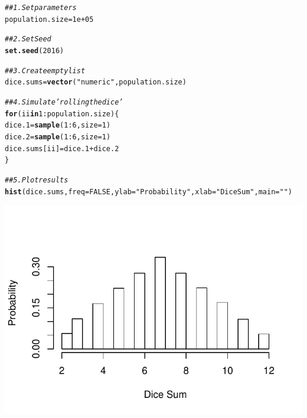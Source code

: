\documentclass{report}\usepackage[]{graphicx}\usepackage[]{color}
\makeatletter
\def\maxwidth{ %
  \ifdim\Gin@nat@width>\linewidth
    \linewidth
  \else
    \Gin@nat@width
  \fi
}
\newcommand{\hlnum}[1]{\textcolor[rgb]{0.686,0.059,0.569}{#1}}%
\newcommand{\hlstr}[1]{\textcolor[rgb]{0.192,0.494,0.8}{#1}}%
\newcommand{\hlcom}[1]{\textcolor[rgb]{0.678,0.584,0.686}{\textit{#1}}}%
\newcommand{\hlopt}[1]{\textcolor[rgb]{0,0,0}{#1}}%
\newcommand{\hlstd}[1]{\textcolor[rgb]{0.345,0.345,0.345}{#1}}%
\newcommand{\hlkwa}[1]{\textcolor[rgb]{0.161,0.373,0.58}{\textbf{#1}}}%
\newcommand{\hlkwb}[1]{\textcolor[rgb]{0.69,0.353,0.396}{#1}}%
\newcommand{\hlkwc}[1]{\textcolor[rgb]{0.333,0.667,0.333}{#1}}%
\newcommand{\hlkwd}[1]{\textcolor[rgb]{0.737,0.353,0.396}{\textbf{#1}}}%
\newenvironment{kframe}{%
 \def\at@end@of@kframe{}%
 \ifinner\ifhmode%
  \def\at@end@of@kframe{\end{minipage}}%
  \begin{minipage}{\columnwidth}%
 \fi\fi%
 \def\FrameCommand##1{\hskip\@totalleftmargin \hskip-\fboxsep
 \colorbox{shadecolor}{##1}\hskip-\fboxsep
     \hskip-\linewidth \hskip-\@totalleftmargin \hskip\columnwidth}%
 \MakeFramed {\advance\hsize-\width
   \@totalleftmargin\z@ \linewidth\hsize
   \@setminipage}}%
 {\par\unskip\endMakeFramed%
 \at@end@of@kframe}
\newenvironment{knitrout}{}{} %
\makeatother
\begin{document}
\begin{knitrout}
\color{fgcolor}\begin{kframe}
\begin{alltt}
\hlcom{## 1. Set parameters}
\hlstd{population.size} \hlkwb{=} \hlnum{1e+05}

\hlcom{## 2. Set Seed}
\hlkwd{set.seed}\hlstd{(}\hlnum{2016}\hlstd{)}

\hlcom{## 3. Create empty list}
\hlstd{dice.sums} \hlkwb{=} \hlkwd{vector}\hlstd{(}\hlstr{"numeric"}\hlstd{, population.size)}

\hlcom{## 4. Simulate 'rolling the dice'}
\hlkwa{for} \hlstd{(ii} \hlkwa{in} \hlnum{1}\hlopt{:}\hlstd{population.size) \{}
    \hlstd{dice.1} \hlkwb{=} \hlkwd{sample}\hlstd{(}\hlnum{1}\hlopt{:}\hlnum{6}\hlstd{,} \hlkwc{size} \hlstd{=} \hlnum{1}\hlstd{)}
    \hlstd{dice.2} \hlkwb{=} \hlkwd{sample}\hlstd{(}\hlnum{1}\hlopt{:}\hlnum{6}\hlstd{,} \hlkwc{size} \hlstd{=} \hlnum{1}\hlstd{)}
    \hlstd{dice.sums[ii]} \hlkwb{=} \hlstd{dice.1} \hlopt{+} \hlstd{dice.2}
\hlstd{\}}

\hlcom{## 5. Plot results}
\hlkwd{hist}\hlstd{(dice.sums,} \hlkwc{freq} \hlstd{=} \hlnum{FALSE}\hlstd{,} \hlkwc{ylab} \hlstd{=} \hlstr{"Probability"}\hlstd{,} \hlkwc{xlab} \hlstd{=} \hlstr{"Dice Sum"}\hlstd{,} \hlkwc{main} \hlstd{=} \hlstr{""}\hlstd{)}
\end{alltt}
\end{kframe}

{\centering \includegraphics[width=\maxwidth]{figure/unnamed-chunk-75-1} 

}



\end{knitrout}
\end{document}
